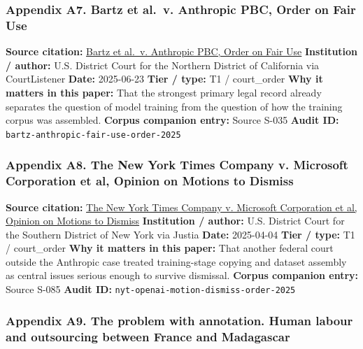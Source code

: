 \documentclass[
  american,
  11pt,
  letterpaper,
]{article}
\begin{document}
\subsubsection{Appendix A7. Bartz et al.~v. Anthropic PBC, Order on Fair
Use}\label{appendix-a7-bartz-et-al-v-anthropic-pbc-order-on-fair-use}

\textbf{Source citation:}
\href{https://storage.courtlistener.com/recap/gov.uscourts.cand.434709/gov.uscourts.cand.434709.231.0_3.pdf}{Bartz
et al.~v. Anthropic PBC, Order on Fair Use} \textbf{Institution /
author:} U.S. District Court for the Northern District of California via
CourtListener \textbf{Date:} 2025-06-23 \textbf{Tier / type:} T1 /
court\_order \textbf{Why it matters in this paper:} That the strongest
primary legal record already separates the question of model training
from the question of how the training corpus was assembled.
\textbf{Corpus companion entry:} Source S-035 \textbf{Audit ID:}
\texttt{bartz-anthropic-fair-use-order-2025}

\subsubsection{Appendix A8. The New York Times Company v. Microsoft
Corporation et al, Opinion on Motions to
Dismiss}\label{appendix-a8-the-new-york-times-company-v-microsoft-corporation-et-al-opinion-on-motions-to-dismiss}

\textbf{Source citation:}
\href{https://cases.justia.com/federal/district-courts/new-york/nysdce/1\%3A2023cv11195/612697/514/0.pdf?ts=1743868265}{The
New York Times Company v. Microsoft Corporation et al, Opinion on
Motions to Dismiss} \textbf{Institution / author:} U.S. District Court
for the Southern District of New York via Justia \textbf{Date:}
2025-04-04 \textbf{Tier / type:} T1 / court\_order \textbf{Why it
matters in this paper:} That another federal court outside the Anthropic
case treated training-stage copying and dataset assembly as central
issues serious enough to survive dismissal. \textbf{Corpus companion
entry:} Source S-085 \textbf{Audit ID:}
\texttt{nyt-openai-motion-dismiss-order-2025}

\subsubsection{Appendix A9. The problem with annotation. Human labour
and outsourcing between France and
Madagascar}\label{appendix-a9-the-problem-with-annotation-human-labour-and-outsourcing-between-france-and-madagascar}
\end{document}
